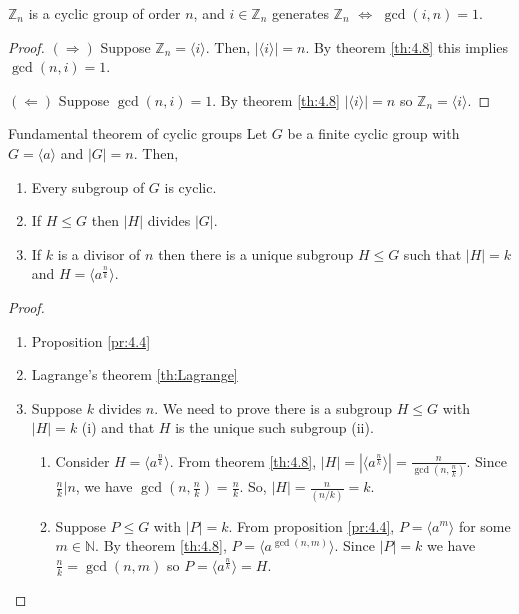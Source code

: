 \documentclass[12pt]{article}
\newcommand{\N}{\mathbb{N}}
\newcommand{\Z}{\mathbb{Z}}
\begin{document}
	\begin{mycor}{}{}
		$\Z_n$ is a cyclic group of order $n$, and $i\in\Z_n$ generates $\Z_n$ $\Longleftrightarrow$ $\gcd(i, n)=1$.
		\begin{proof}
			$(\Rightarrow)$ Suppose $\Z_n=\langle i\rangle$. Then, $|\langle i\rangle|=n$. By theorem \ref{th:4.8} this implies $\gcd(n, i)=1$.
			
			$(\Leftarrow)$ Suppose $\gcd(n, i)=1$. By theorem \ref{th:4.8} $|\langle i\rangle|=n$ so $\Z_n=\langle i\rangle$.
		\end{proof}
	\end{mycor}
	
	\begin{mythm}{Fundamental theorem of cyclic groups}{}
		Let $G$ be a finite cyclic group with $G=\langle a\rangle$ and $|G|=n$. Then,
		\begin{enumerate}
			\item Every subgroup of $G$ is cyclic.
			\item If $H\leq G$ then $|H|$ divides $|G|$.
			\item If $k$ is a divisor of $n$ then there is a unique subgroup $H\leq G$ such that $|H|=k$ and $H=\langle a^{\frac{n}{k}}\rangle$.
		\end{enumerate}
		\begin{proof}~\\
			\begin{enumerate}
				\item Proposition \ref{pr:4.4}
				\item Lagrange's theorem \ref{th:Lagrange}
				\item Suppose $k$ divides $n$. We need to prove there is a subgroup $H\leq G$ with $|H|=k$ (i) and that $H$ is the unique such subgroup (ii).
				\begin{enumerate}[label=(\roman*)]
					\item Consider $H=\langle a^{\frac{n}{k}}\rangle$. From theorem \ref{th:4.8}, $|H|=|\langle a^{\frac{n}{k}}\rangle|=\frac{n}{\gcd(n, \frac{n}{k})}$. Since $\frac{n}{k}|n$, we have $\gcd(n, \frac{n}{k})=\frac{n}{k}$. So, $|H|=\frac{n}{(n/k)}=k$.
					
					\item Suppose $P\leq G$ with $|P|=k$. From proposition \ref{pr:4.4}, $P=\langle a^m\rangle$ for some $m\in\N$. By theorem \ref{th:4.8}, $P=\langle a^{\gcd(n, m)}\rangle$. Since $|P|=k$ we have $\frac{n}{k}=\gcd(n, m)$ so $P=\langle a^{\frac{n}{k}}\rangle=H$.
				\end{enumerate}
			\end{enumerate}
		\end{proof}
	\end{mythm}
	
\end{document}
